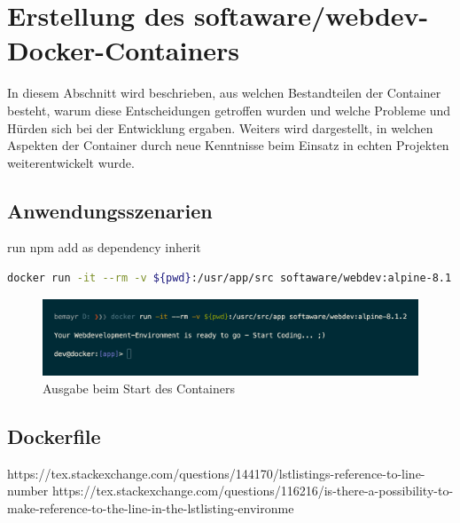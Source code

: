 \chapter{Erstellung des softaware/webdev-Docker-Containers}
\label{cha:implementation}
In diesem Abschnitt wird beschrieben, aus welchen Bestandteilen der Container besteht, warum diese Entscheidungen getroffen wurden und welche Probleme und Hürden sich bei der Entwicklung ergaben.
Weiters wird dargestellt, in welchen Aspekten der Container durch neue Kenntnisse beim Einsatz in echten Projekten weiterentwickelt wurde.

\section{Anwendungsszenarien}

run npm
add as dependency
inherit

\begin{lstlisting}[caption=Kommando zum Starten des softaware/webdev-Containers, language=bash, label=lst:docker-run-webdev]
docker run -it --rm -v ${pwd}:/usr/app/src softaware/webdev:alpine-8.1.2
\end{lstlisting}

\begin{figure}[htbp]
    \centering
    \includegraphics[width=0.92\linewidth,clip]{images/container-execution}
    \caption{Ausgabe beim Start des Containers}
\label{fig:container-execution}
\end{figure}

\section{Dockerfile}
\label{sec:dockerfile}




https://tex.stackexchange.com/questions/144170/lstlistings-reference-to-line-number
https://tex.stackexchange.com/questions/116216/is-there-a-possibility-to-make-reference-to-the-line-in-the-lstlisting-environme

